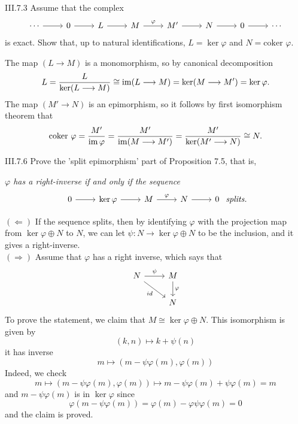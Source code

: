 \begin{problem}{III.7.3}
Assume that the complex
\[
\begin{tikzcd}
\cdots \arrow[r] & 0 \arrow[r] & L \arrow[r] & M \arrow[r, "\varphi"] & M' \arrow[r] & N \arrow[r] & 0 \arrow[r] & \cdots
\end{tikzcd}	
\]
is exact. Show that, up to natural identifications, $L = \ker \varphi$ and $N = \text{coker }\varphi$.
\end{problem}
\begin{pf}
The map $(L \longrightarrow M)$ is a monomorphism, so by canonical decomposition 
\[
L = \frac{L}{\ker (L \longrightarrow M)} \cong \operatorname{im}(L \longrightarrow M) = \ker (M \longrightarrow M') = \ker \varphi.
\]
The map $(M' \longrightarrow N)$ is an epimorphism, so it follows by first isomorphism theorem that
\[
\text{coker }\varphi=\frac{M'}{\operatorname{im} \varphi}=\frac{M'}{\operatorname{im}(M \longrightarrow M')}= \frac{M'}{\ker(M' \longrightarrow N)} \cong N.
\]
\end{pf}

\begin{problem}{III.7.6}
Prove the 'split epimorphism' part of Proposition 7.5, that is,

\textit{$\varphi$ has a right-inverse if and only if the sequence} 
\[
\begin{tikzcd}
0 \arrow[r] & \ker \varphi \arrow[r] & M \arrow[r, "\varphi"] & N \arrow[r] & 0
\end{tikzcd}	
\textit{ splits.}
\]
\end{problem}
\begin{pf}

\noindent $(\Leftarrow)$ If the sequence splits, then by identifying $\varphi$ with the projection map from $\ker \varphi \oplus N$ to $N$, we can let $\psi : N \to \ker \varphi \oplus N $ to be the inclusion, and it gives a right-inverse. \\
$(\Rightarrow)$ Assume that $\varphi$ has a right inverse, which says that 
\[
\begin{tikzcd}
N \arrow[r, "\psi"] \arrow[rd, "id"'] & M \arrow[d, "\varphi"] \\
& N
\end{tikzcd}	
\]
To prove the statement, we claim that $M \cong \ker \varphi \oplus N$. This isomorphism is given by 
\[
(k,n) \mapsto k + \psi (n)
\]
it has inverse
\[
m \mapsto (m-\psi\varphi(m), \varphi(m))	
\]
Indeed, we check
\[
m \mapsto (m-\psi\varphi(m), \varphi(m)) \mapsto m-\psi\varphi(m) + \psi\varphi(m) = m
\]
and $m-\psi\varphi(m)$ is in $\ker \varphi$ since
\[
\varphi(m-\psi\varphi(m)) = \varphi(m) - \varphi\psi\varphi(m) = 0
\]
and the claim is proved.
\end{pf}

